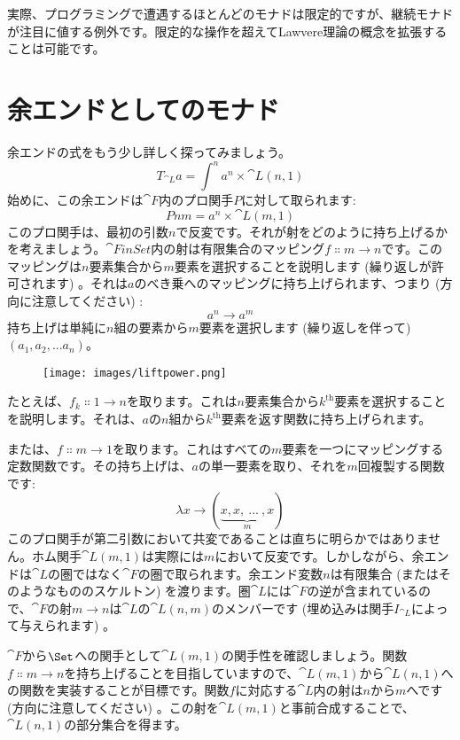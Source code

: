 実際、プログラミングで遭遇するほとんどのモナドは限定的ですが、継続モナドが注目に値する例外です。限定的な操作を超えてLawvere理論の概念を拡張することは可能です。

\section{余エンドとしてのモナド}

余エンドの式をもう少し詳しく探ってみましょう。
\[T_{\cat{L}} a = \int^n a^n \times \cat{L}(n, 1)\]
始めに、この余エンドは$\cat{F}$内のプロ関手$P$に対して取られます: 
\[P n m = a^n \times \cat{L}(m, 1)\]
このプロ関手は、最初の引数$n$で反変です。それが射をどのように持ち上げるかを考えましょう。$\cat{FinSet}$内の射は有限集合のマッピング$f \Colon m \to n$です。このマッピングは$n$要素集合から$m$要素を選択することを説明します (繰り返しが許可されます) 。それは$a$のべき乗へのマッピングに持ち上げられます、つまり (方向に注意してください) : 
\[a^n \to a^m\]
持ち上げは単純に$n$組の要素から$m$要素を選択します (繰り返しを伴って) $(a_1, a_2,...a_n)$。

\begin{figure}[H]
  \centering
  \texttt{[image: images/liftpower.png]}
\end{figure}

たとえば、$f_k \Colon 1 \to n$を取ります。これは$n$要素集合から$k^\text{th}$要素を選択することを説明します。それは、$a$の$n$組から$k^\text{th}$要素を返す関数に持ち上げられます。

または、$f \Colon m \to 1$を取ります。これはすべての$m$要素を一つにマッピングする定数関数です。その持ち上げは、$a$の単一要素を取り、それを$m$回複製する関数です: 
\[\lambda{}x \to (\underbrace{x, x,\ ...\ , x}_{m})\]
このプロ関手が第二引数において共変であることは直ちに明らかではありません。ホム関手$\cat{L}(m, 1)$は実際には$m$において反変です。しかしながら、余エンドは$\cat{L}$の圏ではなく$\cat{F}$の圏で取られます。余エンド変数$n$は有限集合 (またはそのようなもののスケルトン) を渡ります。圏$\cat{L}$には$\cat{F}$の逆が含まれているので、$\cat{F}$の射$m \to n$は$\cat{L}$の$\cat{L}(n, m)$のメンバーです (埋め込みは関手$I_{\cat{L}}$によって与えられます) 。

$\cat{F}$から$\Set$への関手として$\cat{L}(m, 1)$の関手性を確認しましょう。関数$f \Colon m \to n$を持ち上げることを目指していますので、$\cat{L}(m, 1)$から$\cat{L}(n, 1)$への関数を実装することが目標です。関数$f$に対応する$\cat{L}$内の射は$n$から$m$へです (方向に注意してください) 。この射を$\cat{L}(m, 1)$と事前合成することで、$\cat{L}(n, 1)$の部分集合を得ます。

